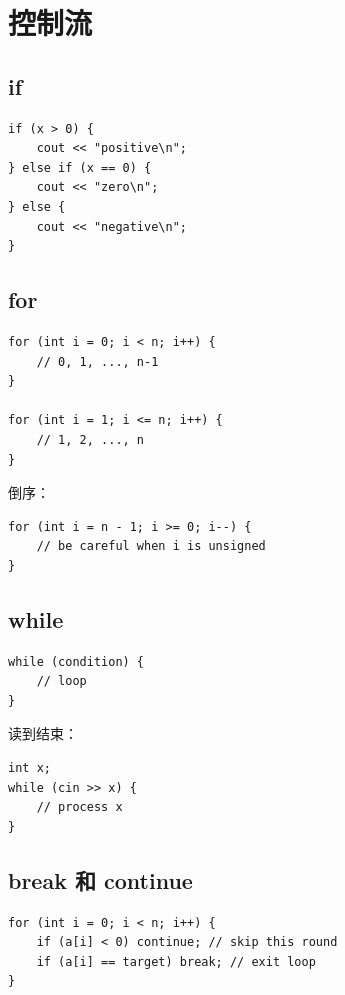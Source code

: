 \section{控制流}\label{sec:04-7}

\subsection{if}

\begin{lstlisting}
if (x > 0) {
    cout << "positive\n";
} else if (x == 0) {
    cout << "zero\n";
} else {
    cout << "negative\n";
}
\end{lstlisting}

\subsection{for}

\begin{lstlisting}
for (int i = 0; i < n; i++) {
    // 0, 1, ..., n-1
}

for (int i = 1; i <= n; i++) {
    // 1, 2, ..., n
}
\end{lstlisting}

倒序：

\begin{lstlisting}
for (int i = n - 1; i >= 0; i--) {
    // be careful when i is unsigned
}
\end{lstlisting}

\subsection{while}

\begin{lstlisting}
while (condition) {
    // loop
}
\end{lstlisting}

读到结束：

\begin{lstlisting}
int x;
while (cin >> x) {
    // process x
}
\end{lstlisting}

\subsection{break 和 continue}

\begin{lstlisting}
for (int i = 0; i < n; i++) {
    if (a[i] < 0) continue; // skip this round
    if (a[i] == target) break; // exit loop
}
\end{lstlisting}

